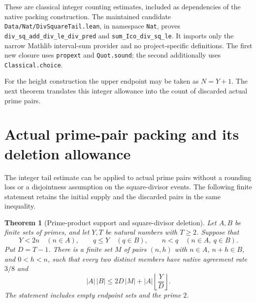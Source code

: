 \documentclass[11pt]{article}
\newtheorem{theorem}{Theorem}[section]
\begin{document}
These are classical integer counting estimates, included as dependencies
of the native packing construction. The maintained candidate
\texttt{Data/Nat/DivSquareTail.\allowbreak lean}, in namespace
\texttt{Nat}, proves
\texttt{div\_sq\_add\_div\_le\_div\_pred} and
\texttt{sum\_Ico\_div\_sq\_le}.
It imports only the narrow Mathlib interval-sum provider and no
project-specific definitions. The first new closure uses
\texttt{propext} and \texttt{Quot.sound}; the second additionally
uses \texttt{Classical.choice}.

For the height construction the upper endpoint may be taken as
\(N=Y+1\). The next theorem translates this integer allowance into
the count of discarded actual prime pairs.

\section{Actual prime-pair packing and its deletion allowance}
\label{sec:native-height-square-tail}

The integer tail estimate can be applied to actual prime pairs without
a rounding loss or a disjointness assumption on the square-divisor
events. The following finite statement retains the initial supply
and the discarded pairs in the same inequality.

\begin{theorem}[Prime-product support and square-divisor deletion]
\label{thm:native-height-square-tail}
Let \(A,B\) be finite sets of primes, and let \(Y,T\) be natural
numbers with \(T\ge2\). Suppose that
\[
 Y<2n\quad(n\in A),\qquad q\le Y\quad(q\in B),\qquad
 n<q\quad(n\in A,\ q\in B).
\]
Put \(D=T-1\). There is a finite set \(M\) of pairs \((n,h)\)
with \(n\in A\), \(n+h\in B\), and \(0<h<n\), such that
every two distinct members have native agreement rate \(3/8\) and
\begin{equation}
 |A|\,|B|
 \le 2D\,|M|+|A|\left\lfloor\frac{Y}{D}\right\rfloor.
 \label{eq:native-height-square-tail}
\end{equation}
The statement includes empty endpoint sets and the prime \(2\).
\end{theorem}
\end{document}
